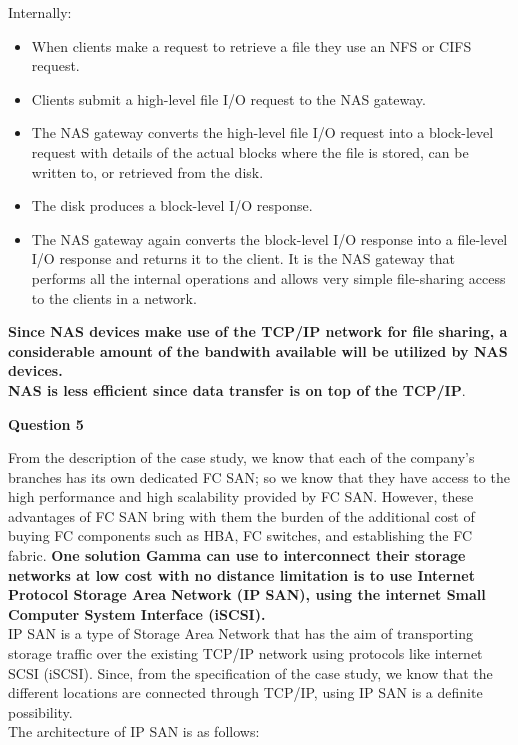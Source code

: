 \documentclass[a4paper, 12pt]{article}
\begin{document}
Internally:
\begin{itemize}
\item
When clients make a request to retrieve a file they use an NFS or CIFS request.
\item
Clients submit a high-level file I/O request to the NAS gateway.
\item
The NAS gateway converts the high-level file I/O request into a block-level request with details of the actual blocks where the file is stored, can be written to, or retrieved from the disk.
\item
The disk produces a block-level I/O response.
\item
The NAS gateway again converts the block-level I/O response into a file-level I/O response and returns it to the client. It is the NAS gateway that performs all the internal operations and allows very simple file-sharing access to the clients in a network.
\end{itemize}

\textbf{Since NAS devices make use of the TCP/IP network for file sharing, a considerable amount of the bandwith available will be utilized by NAS devices.\\ 
NAS is less efficient since data transfer is on top of the TCP/IP}.

\newpage
\begin{center}
\textbf{Question 5}
\end{center}
From the description of the case study, we know that each of the company's branches has its own dedicated FC SAN; so we know that they have access to the high performance and high scalability provided by FC SAN. However, these advantages of FC SAN bring with them the burden of the additional cost of buying FC components such as HBA, FC switches, and establishing the FC fabric. \textbf{One solution Gamma can use to interconnect their storage networks at low cost with no distance limitation is to use Internet Protocol Storage Area Network (IP SAN), using the internet Small Computer System Interface (iSCSI).}\\
\indent
IP SAN is a type of Storage Area Network that has the aim of transporting storage traffic over the existing TCP/IP network using protocols like internet SCSI (iSCSI). Since, from the specification of the case study, we know that the different locations are connected through TCP/IP, using IP SAN is a definite possibility.\\

The architecture of IP SAN is as follows:
\end{document}
